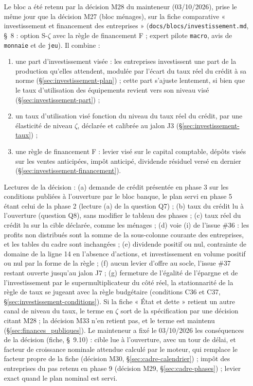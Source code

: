 \documentclass[11pt,a4paper]{article}
\begin{document}
\begin{proposee}
Le bloc a été retenu par la décision M28 du mainteneur (03/10/2026), prise le même jour que la décision M27 (bloc ménages), sur la fiche comparative « investissement et financement des entreprises » (\nolinkurl{docs/blocs/investissement.md}, \S~8 : option S-$\zeta$ avec la règle de financement F ; expert pilote \texttt{macro}, avis de \texttt{monnaie} et de \texttt{jeu}). Il combine :
\begin{enumerate}[label=(\alph*)]
\item une part d'investissement visée : les entreprises investissent une part de la production qu'elles attendent, modulée par l'écart du taux réel du crédit à sa norme (\S\ref{sec:investissement-plan}) ; cette part s'ajuste lentement, si bien que le taux d'utilisation des équipements revient vers son niveau visé (\S\ref{sec:investissement-part}) ;
\item un taux d'utilisation visé fonction du niveau du taux réel du crédit, par une élasticité de niveau $\zeta$, déclarée et calibrée au jalon J3 (\S\ref{sec:investissement-taux}) ;
\item une règle de financement F : levier visé sur le capital comptable, dépôts visés sur les ventes anticipées, impôt anticipé, dividende résiduel versé en dernier (\S\ref{sec:investissement-financement}).
\end{enumerate}
Lectures de la décision : (a) demande de crédit présentée en phase 3 sur les conditions publiées à l'ouverture par le bloc banque, le plan servi en phase 5 étant celui de la phase 2 (lecture (a) de la question Q7) ; (b) taux du crédit lu à l'ouverture (question Q8), sans modifier le tableau des phases ; (c) taux réel du crédit lu sur la cible déclarée, comme les ménages ; (d) voie (i) de l'issue \#36 : les profits non distribués sont la somme de la sous-colonne courante des entreprises, et les tables du cadre sont inchangées ; (e) dividende positif ou nul, contrainte de domaine de la ligne 14 en l'absence d'actions, et investissement en volume positif ou nul par la forme de la règle ; (f) aucun levier d'offre au socle, l'issue \#37 restant ouverte jusqu'au jalon J7 ; (g) fermeture de l'égalité de l'épargne et de l'investissement par le supermultiplicateur du côté réel, la stationnarité de la règle de taux se jugeant avec la règle budgétaire (conditions C36 et C37, \S\ref{sec:investissement-conditions}). Si la fiche « État et dette » retient un autre canal de niveau du taux, le terme en $\zeta$ sort de la spécification par une décision citant M28 ; la décision M33 n'en retient pas, et le terme est maintenu (\S\ref{sec:finances_publiques}). Le mainteneur a fixé le 03/10/2026 les conséquences de la décision (fiche, \S~9.10) : cible lue à l'ouverture, avec un tour de délai, et facteur de croissance nominale attendue calculé par le moteur, qui remplace le facteur propre de la fiche (décision M30, \S\ref{sec:cadre-calendrier}) ; impôt des entreprises du pas retenu en phase 9 (décision M29, \S\ref{sec:cadre-phases}) ; levier exact quand le plan nominal est servi.


\end{proposee}
\end{document}
